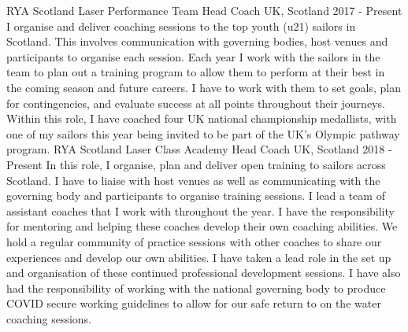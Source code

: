 \begin{cventries}
  \cventry
    {RYA Scotland} %
    {Laser Performance Team Head Coach} %
    {UK, Scotland} %
    {2017 - Present} %
    {
        I organise and deliver coaching sessions to the top youth (u21) sailors in Scotland. This involves communication with governing bodies, host venues and participants to organise each session. Each year I work with the sailors in the team to plan out a training program to allow them to perform at their best in the coming season and future careers. I have to work with them to set goals, plan for contingencies, and evaluate success at all points throughout their journeys.\newline
        Within this role, I have coached four UK national championship medallists, with one of my sailors this year being invited to be part of the UK's Olympic pathway program.\newline
     }
       \cventry
    {RYA Scotland} %
    {Laser Class Academy Head Coach} %
    {UK, Scotland} %
    {2018 - Present} %
    {
        In this role, I organise, plan and deliver open training to sailors across Scotland. I have to liaise with host venues as well as communicating with the governing body and participants to organise training sessions. I lead a team of assistant coaches that I work with throughout the year. I have the responsibility for mentoring and helping these coaches develop their own coaching abilities. We hold a regular community of practice sessions with other coaches to share our experiences and develop our own abilities. I have taken a lead role in the set up and organisation of these continued professional development sessions.\newline
        I have also had the responsibility of working with the national governing body to produce COVID secure working guidelines to allow for our safe return to on the water coaching sessions.\newline
    }

\end{cventries}

